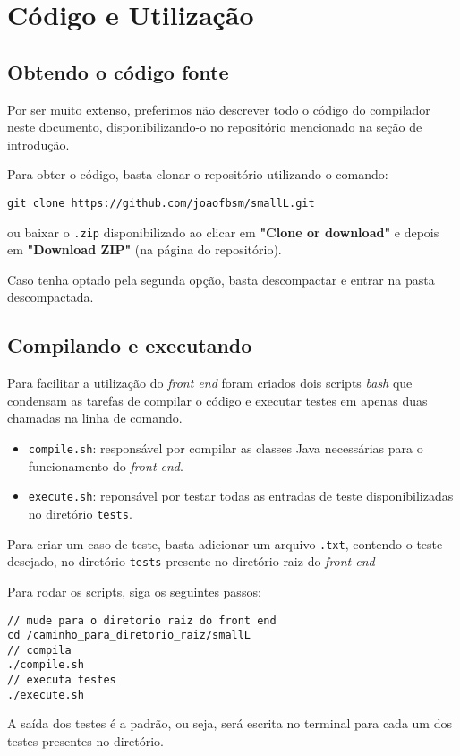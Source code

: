 \section{Código e Utilização}

\subsection{Obtendo o código fonte}
Por ser muito extenso, preferimos não descrever todo o código do compilador neste documento, disponibilizando-o no repositório mencionado na seção de introdução.

Para obter o código, basta clonar o repositório utilizando o comando:

\begin{lstlisting}
git clone https://github.com/joaofbsm/smallL.git
\end{lstlisting}

ou baixar o \texttt{.zip} disponibilizado ao clicar em \textbf{"Clone or download"} e depois em \textbf{"Download ZIP"} (na página do repositório).

Caso tenha optado pela segunda opção, basta descompactar e entrar na pasta descompactada.

\subsection{Compilando e executando}
Para facilitar a utilização do \textit{front end} foram criados dois scripts \textit{bash} que condensam as tarefas de compilar o código e executar testes em apenas duas chamadas na linha de comando.

\begin{itemize}
\item \texttt{compile.sh}: responsável por compilar as classes Java necessárias para o funcionamento do \textit{front end}.
\item \texttt{execute.sh}: reponsável por testar todas as entradas de teste disponibilizadas no diretório \texttt{tests}.
\end{itemize}

Para criar um caso de teste, basta adicionar um arquivo \texttt{.txt}, contendo o teste desejado, no diretório \texttt{tests} presente no diretório raiz do \textit{front end}

Para rodar os scripts, siga os seguintes passos:\\



\begin{lstlisting}
// mude para o diretorio raiz do front end
cd /caminho_para_diretorio_raiz/smallL
// compila
./compile.sh
// executa testes
./execute.sh
\end{lstlisting}

A saída dos testes é a padrão, ou seja, será escrita no terminal para cada um dos testes presentes no diretório.